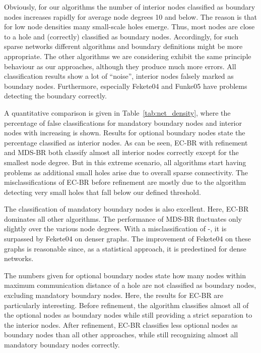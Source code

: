 \documentclass{llncs}
\begin{document}
Obviously, for our algorithms the number of interior nodes classified as boundary nodes increases rapidly for average node degrees 10 and below.
The reason is that for low node densities many small-scale holes emerge.
Thus, most nodes are close to a hole and (correctly) classified as boundary nodes.
Accordingly, for such sparse networks different algorithms and boundary definitions might be more appropriate.
The other algorithms we are considering exhibit the same principle behaviour as our approaches, although they produce much more errors.
All classification results show a lot of ``noise'', interior nodes falsely marked as boundary nodes.
Furthermore, especially Fekete04 and Funke05 have problems detecting the boundary correctly.

A quantitative comparison is given in Table~\ref{tab:net_density}, where the percentage of false classifications for mandatory boundary nodes and interior nodes with increasing  is shown.
Results for optional boundary nodes state the percentage classified as interior nodes.
As can be seen, EC-BR with refinement and MDS-BR both classify almost all interior nodes correctly except for the smallest node degree.
But in this extreme scenario, all algorithms start having problems as additional small holes arise due to overall sparse connectivity.
The misclassifications of EC-BR before refinement are mostly due to the algorithm detecting very small holes that fall below our defined threshold.

The classification of mandatory boundary nodes is also excellent.
Here, EC-BR dominates all other algorithms.
The performance of MDS-BR fluctuates only slightly over the various node degrees.
With a misclassification of -, it is surpassed by Fekete04 on denser graphs.
The improvement of Fekete04 on these graphs is reasonable since, as a statistical approach, it is predestined for dense networks.

The numbers given for optional boundary nodes state how many nodes within maximum communication distance of a hole are not classified as boundary nodes, excluding mandatory boundary nodes.
Here, the results for EC-BR are particularly interesting.
Before refinement, the algorithm classifies almost all of the optional nodes as boundary nodes while still providing a strict separation to the interior nodes.
After refinement, EC-BR classifies less optional nodes as boundary nodes than all other approaches, while still recognizing almost all mandatory boundary nodes correctly.
\end{document}
